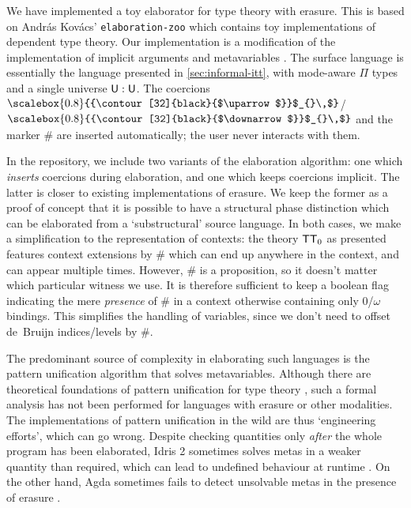 \documentclass[10pt,a4paper]{article}
\theoremstyle{definition}
\theoremstyle{remark}
\newcommand{\s}[1]{{\ensuremath{\textsf{\upshape #1}}}\xspace}
\newcommand{\ZTT}{\ensuremath{\s{TT}_0}\xspace}
\def\arrowscale{0.8}
\def\arrowshift{0.9pt}
\newcommand{\arrowwrap}[2]{%
  \text{\raisebox{\arrowshift}{\scalebox{\arrowscale}{{\contour[32]{black}{$#1$}}$_{#2}\,$}}}%
}
\newcommand{\uptm}[1][]{\arrowwrap{\uparrow}{#1}}
\newcommand{\downtm}[1][]{\arrowwrap{\downarrow}{#1}}
\begin{document}
We have implemented a toy elaborator for type theory
with erasure. This is based on Andr\'as Kov\'acs' \texttt{elaboration-zoo} which
contains toy implementations of dependent type theory. Our implementation is a
modification of the implementation of implicit arguments and metavariables
\cite{KovacsUnknown-sx}. The surface language is essentially the
language presented in \cref{sec:informal-itt}, with mode-aware $\Pi$ types and a
single universe $\s U : \s U$. The coercions $\uptm$/$\downtm$ and the marker
$\#$ are inserted automatically; the user never interacts with them.

In the repository, we include two variants of the elaboration algorithm: one
which \emph{inserts} coercions during elaboration, and one which keeps coercions
implicit. The latter is closer to existing implementations of
erasure. We keep the former as a proof of concept that it is possible to have a
structural phase distinction which can be elaborated from a `substructural'
source language. In both cases, we make a simplification to the representation
of contexts: the theory \ZTT as presented features context extensions by $\#$
which can end up anywhere in the context, and can appear multiple times.
However, $\#$ is a proposition, so it doesn't matter which particular witness we
use. It is therefore sufficient to keep a boolean flag indicating the mere
\emph{presence} of $\#$ in a context otherwise containing only 0/$\omega$
bindings. This simplifies the handling of variables, since we don't need to
offset de~Bruijn indices/levels by $\#$.

The predominant source of complexity in elaborating such languages is the
pattern unification algorithm that solves metavariables. Although there are
theoretical foundations of pattern unification for type theory
\cite{Abel2011-sx}, such a formal analysis has not been performed for languages
with erasure or other modalities. The implementations of pattern unification in
the wild are thus `engineering efforts', which can go wrong. Despite checking
quantities only \emph{after} the whole program has been elaborated, Idris 2
sometimes solves metas in a weaker quantity than required, which can lead to
undefined behaviour at runtime \cite{Dunham2024-up}. On the other hand, Agda
sometimes fails to detect unsolvable metas in the presence of erasure
\cite{Cockx2021-mq}. 
\end{document}
